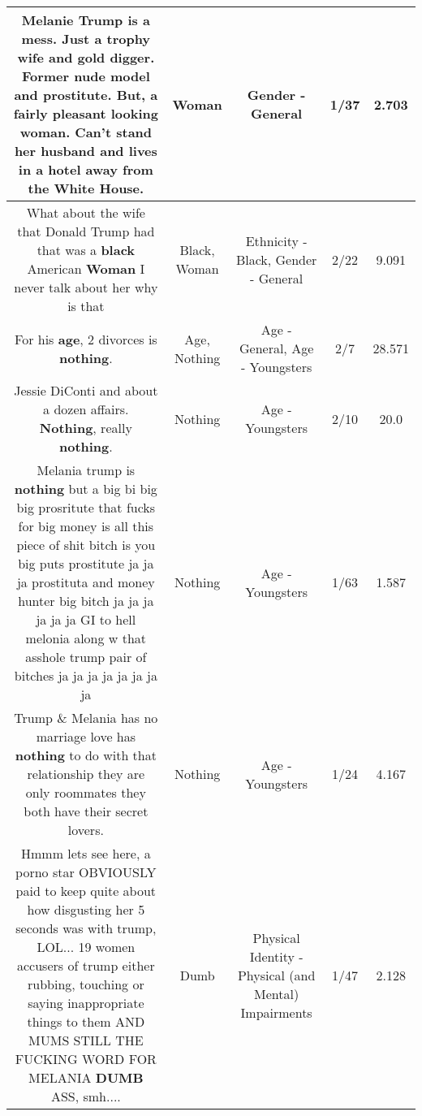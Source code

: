\documentclass[11pt]{article}
\newlength\mylength
\begin{document}
\begin{center}
\begin{longtable}{|C{.65\mylength}|C{.30\mylength}|C{.12\mylength}|C{.12\mylength}|C{.12\mylength}|}
  \small Melanie Trump is a mess. Just a trophy wife and gold digger. Former nude model and prostitute. But, a fairly pleasant looking \textbf{woman}. Can't stand her husband and lives in a hotel away from the White House.\normalsize   & Woman & Gender - General & 1/37 & 2.703 \\  \hline
  \small What about the wife that Donald Trump had that was a \textbf{black} American \textbf{Woman} I never talk about her why is that\normalsize   & Black, Woman & Ethnicity - Black, Gender - General & 2/22 & 9.091 \\  \hline
  \small For his \textbf{age}, 2 divorces is \textbf{nothing}.\normalsize   & Age, Nothing & Age - General, Age - Youngsters & 2/7 & 28.571 \\  \hline
  \small Jessie DiConti and about a dozen affairs. \textbf{Nothing}, really \textbf{nothing}.\normalsize   & Nothing & Age - Youngsters & 2/10 & 20.0 \\  \hline
  \small Melania trump is \textbf{nothing} but a big bi big big prosritute that fucks for big money is all this piece of shit bitch is you big puts prostitute ja ja ja prostituta and money hunter big bitch ja ja ja ja ja ja GI to hell melonia along w that asshole trump pair of bitches ja ja ja ja ja ja ja ja\normalsize   & Nothing & Age - Youngsters & 1/63 & 1.587 \\  \hline
  \small Trump \& Melania has no marriage love has \textbf{nothing} to do with that relationship they are only roommates they both have their secret lovers.\normalsize   & Nothing & Age - Youngsters & 1/24 & 4.167 \\  \hline
  \small Hmmm lets see here, a porno star OBVIOUSLY paid to keep quite about how disgusting her 5 seconds was with trump, LOL...   19 women accusers of trump either rubbing, touching or saying inappropriate things to them AND MUMS STILL THE FUCKING WORD FOR MELANIA \textbf{DUMB} ASS, smh....\normalsize   & Dumb & Physical Identity - Physical (and Mental) Impairments & 1/47 & 2.128 \\  \hline

\end{longtable}
\end{center}
\end{document}
